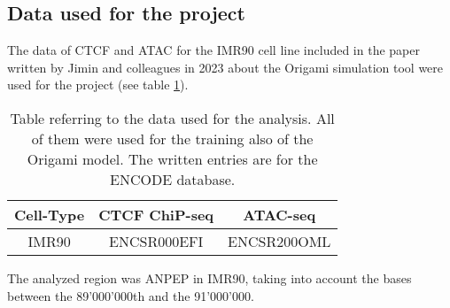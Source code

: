 \subsection{Data used for the project}
The data of CTCF and ATAC for the IMR90 cell line included in the paper written by Jimin and colleagues in 2023 about the Origami simulation tool
\cite{tanCelltypespecificPrediction3D2023}
were used for the project (see table \ref{tab:data}).

\begin{table}[H]
    \centering
    \begin{tabular}{|c|c|c|}
        \hline
        \textbf{Cell-Type} & \textbf{CTCF ChiP-seq} & \textbf{ATAC-seq}\\
        \hline
        IMR90 & ENCSR000EFI & ENCSR200OML\\
        \hline
    \end{tabular}
    \caption{Table referring to the data used for the analysis. All of them were used for the training also of the Origami\cite{tanCelltypespecificPrediction3D2023} model. The written entries are for the ENCODE database\cite{encodeprojectconsortiumIntegratedEncyclopediaDNA2012}.}
    \label{tab:data}
\end{table}

The analyzed region was ANPEP in IMR90, taking into account the bases between the 89'000'000th and the 91'000'000. 